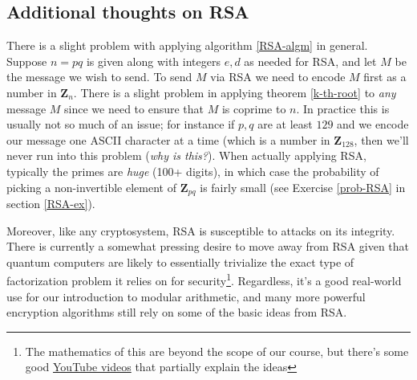 \documentclass[12pt]{article}
\numberwithin{equation}{subsection}
\theoremstyle{note}
\begin{document}
\subsection{Additional thoughts on RSA}
There is a slight problem with applying algorithm \ref{RSA-algm} in general. Suppose $n=pq$ is given along with integers $e,d$ as needed for RSA, and let $M$ be the message we wish to send. To send $M$ via RSA we need to encode $M$ first as a number in $\mathbf{Z}_{n}$. There is a slight problem in applying theorem \ref{k-th-root} to \textit{any} message $M$ since we need to ensure that $M$ is coprime to $n$. In practice this is usually not so much of an issue; for instance if $p,q$ are at least $129$ and we encode our message one ASCII character at a time (which is a number in $\mathbf{Z}_{128}$, then we'll never run into this problem (\textit{why is this?}). When actually applying RSA, typically the primes are \textit{huge} (100+ digits), in which case the probability of picking a non-invertible element of $\mathbf{Z}_{pq}$ is fairly small (see Exercise \ref{prob-RSA} in section \ref{RSA-ex}).

Moreover, like any cryptosystem, RSA is susceptible to attacks on its integrity. There is currently a somewhat pressing desire to move away from RSA given that quantum computers are likely to essentially trivialize the exact type of factorization problem it relies on for security\footnote{The mathematics of this are beyond the scope of our course, but there's some good \href{https://youtu.be/-UrdExQW0cs?si=QaniK-f26fjQKmVA}{YouTube videos} that partially explain the ideas}. Regardless, it's a good real-world use for our introduction to modular arithmetic, and many more powerful encryption algorithms still rely on some of the basic ideas from RSA. 
\end{document}

